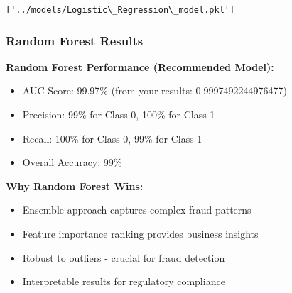 \documentclass[11pt]{article}
\makeatletter
\providecommand{\tightlist}{%
      \setlength{\itemsep}{0pt}\setlength{\parskip}{0pt}}
\newcommand{\boxspacing}{\kern\kvtcb@left@rule\kern\kvtcb@boxsep}
\newcommand{\prompt}[4]{
        {\ttfamily\llap{{\color{#2}[#3]:\hspace{3pt}#4}}\vspace{-\baselineskip}}
    }
\makeatother
\begin{document}
            \begin{tcolorbox}[breakable, size=fbox, boxrule=.5pt, pad at break*=1mm, opacityfill=0]
\prompt{Out}{outcolor}{23}{\boxspacing}
\begin{Verbatim}[commandchars=\\\{\}]
['../models/Logistic\_Regression\_model.pkl']
\end{Verbatim}
\end{tcolorbox}
        
    \subsubsection{Random Forest Results}\label{random-forest-results}

\textbf{Random Forest Performance (Recommended Model):}

\begin{itemize}
\tightlist
\item
  AUC Score: 99.97\% (from your results: 0.9997492244976477)
\item
  Precision: 99\% for Class 0, 100\% for Class 1
\item
  Recall: 100\% for Class 0, 99\% for Class 1
\item
  Overall Accuracy: 99\%
\end{itemize}

\textbf{Why Random Forest Wins:}

\begin{itemize}
\tightlist
\item
  Ensemble approach captures complex fraud patterns
\item
  Feature importance ranking provides business insights
\item
  Robust to outliers - crucial for fraud detection
\item
  Interpretable results for regulatory compliance
\end{itemize}
\end{document}

